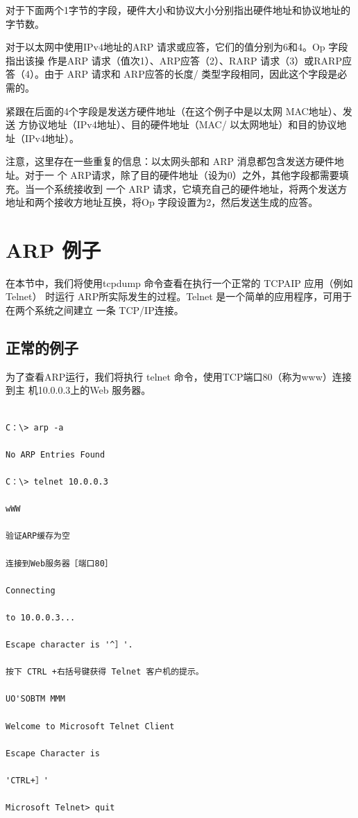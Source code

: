 对于下面两个1字节的字段，硬件大小和协议大小分别指出硬件地址和协议地址的字节数。

对于以太网中使用IPv4地址的ARP 请求或应答，它们的值分别为6和4。Op 字段指出该操
作是ARP 请求（值次1）、ARP应答（2）、RARP 请求（3）或RARP应答（4）。由于 ARP
请求和 ARP应答的长度/ 类型字段相同，因此这个字段是必需的。

紧跟在后面的4个字段是发送方硬件地址（在这个例子中是以太网 MAC地址）、发送
方协议地址（IPv4地址）、目的硬件地址（MAC/ 以太网地址）和目的协议地址（IPv4地址）。

注意，这里存在一些重复的信息：以太网头部和 ARP 消息都包含发送方硬件地址。对于一
个 ARP请求，除了目的硬件地址（设为0）之外，其他字段都需要填充。当一个系统接收到
一个 ARP 请求，它填充自己的硬件地址，将两个发送方地址和两个接收方地址互换，将Op
字段设置为2，然后发送生成的应答。

\section{ARP 例子}

在本节中，我们将使用tcpdump 命令查看在执行一个正常的 TCPAIP 应用（例如 Telnet）
时运行 ARP所实际发生的过程。Telnet 是一个简单的应用程序，可用于在两个系统之间建立
一条 TCP/IP连接。

\subsection{正常的例子}

为了查看ARP运行，我们将执行 telnet 命令，使用TCP端口80（称为www）连接到主
机10.0.0.3上的Web 服务器。

\begin{verbatim}
    
C：\> arp -a

No ARP Entries Found

C：\> telnet 10.0.0.3

wWW

验证ARP缓存为空

连接到Web服务器［端口80］

Connecting

to 10.0.0.3...

Escape character is '^］'.

按下 CTRL +右括号键获得 Telnet 客户机的提示。

UO'SOBTM MMM

Welcome to Microsoft Telnet Client

Escape Character is

'CTRL+］'

Microsoft Telnet> quit
\end{verbatim}

